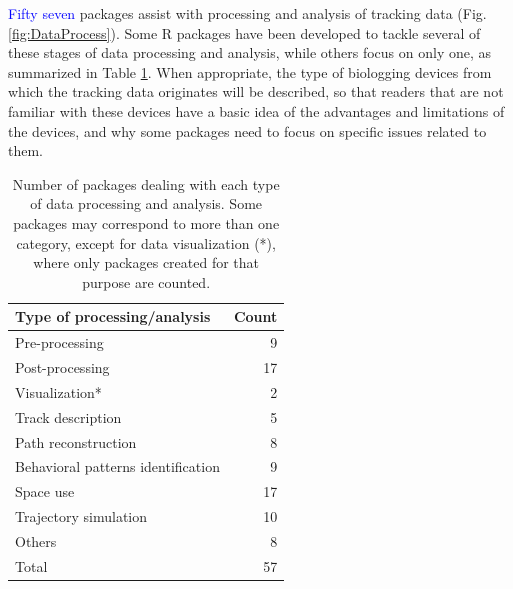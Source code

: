 \documentclass[a4paper,12pt]{article}
\begin{document}
\textcolor{blue}{Fifty seven} packages assist with processing and analysis of tracking data (Fig. \ref{fig:DataProcess}). Some R packages have been developed to tackle several of these stages of data processing and analysis, while others focus on only one, as summarized in Table \ref{table:PurposeTable}. When appropriate, the type of biologging devices from which the tracking data originates will be described, so that readers that are not familiar with these devices have a basic idea of the advantages and limitations of the devices, and why some packages need to focus on specific issues related to them. 
%
\begin{table}[ht]
        \centering
        \begin{tabular}{lr}
                \hline
                Type of processing/analysis & Count \\ 
                \hline
                Pre-processing & 9 \\
                Post-processing & 17 \\
                Visualization* & 2 \\ 
                Track description & 5 \\ 
                Path reconstruction  & 8 \\ 
                Behavioral patterns identification & 9 \\ 
                Space use & 17 \\ 
                Trajectory simulation & 10 \\ 
                Others & 8 \\ 
                \hline
                Total & 57 \\
                \hline
        \end{tabular}
        \caption{\label{table:PurposeTable} Number of packages dealing with each type of data processing and analysis. Some packages may correspond to more than one category, except for data visualization (*), where only packages created for that purpose are counted.}
\end{table}
\end{document}
